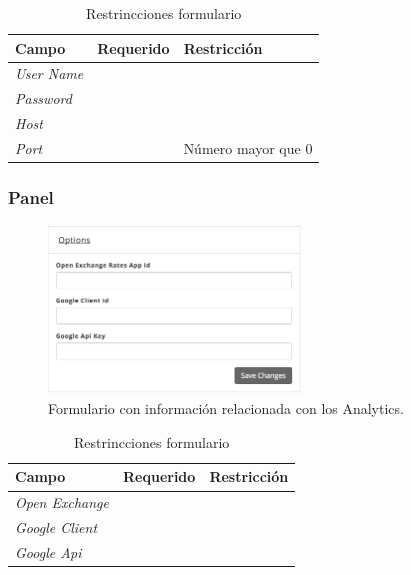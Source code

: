 \begin{table}[H]
    \centering
	\begin{tabular}{ |l|c||l| }
		\hline Campo & Requerido & Restricción \\ \hline
		\multirow{1}{*}{\textit{User Name}} &  {\checkmark} &  \\ \hline
		\multirow{1}{*}{\textit{Password}} 	&  {\checkmark} &  \\ \hline
		\multirow{1}{*}{\textit{Host}} 		&  {\checkmark} &  \\ \hline
		\multirow{1}{*}{\textit{Port}} 		&  {\checkmark} & Número mayor que 0 \\ \hline
		\hline
	\end{tabular}
 	\caption{Restrincciones formulario \mailPanel}
    \label{tab:dashboard:ecommerce:form:mail}
\end{table}


\subsubsection*{Panel \optionsPanel}

\begin{figure}[H]
	\centering
	\includegraphics[width=0.6\textwidth]{figuras/dashboard/ecommerce/options/menu.png}
	\caption{Formulario con información relacionada con los Analytics.}
	\label{figure:dashboard:ecommerce:options:menu}
\end{figure}

\begin{table}[H]
    \centering
	\begin{tabular}{ |l|c||l| }
		\hline Campo & Requerido & Restricción \\ \hline
		\multirow{1}{*}{\textit{Open Exchange}} 	&  {\checkmark} &  \\ \hline
		\multirow{1}{*}{\textit{Google Client}} 	&  {\checkmark} &  \\ \hline
		\multirow{1}{*}{\textit{Google Api}} 		&  {\checkmark} &  \\ \hline
		\hline
	\end{tabular}
 	\caption{Restrincciones formulario \optionsPanel}
    \label{tab:dashboard:ecommerce:form:options}
\end{table}